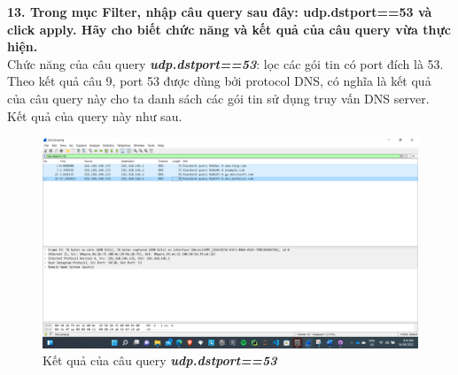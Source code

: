 \textbf{13.	 Trong mục Filter, nhập câu query sau đây: udp.dstport==53 và click apply. Hãy cho biết chức năng và kết quả của câu query vừa thực hiện.}\\
Chức năng của câu query \textbf{\textit{udp.dstport==53}}: lọc các gói tin có port đích là 53. Theo kết quả câu 9, port 53 được dùng bởi protocol DNS, có nghĩa là kết quả của câu query này cho ta danh sách các gói tin sử dụng truy vấn DNS server.\\
Kết quả của query này như sau.
\begin{figure}[H]
\begin{center}
\includegraphics[scale=.45]{../figures/p2/p2_query}
\end{center}
\caption{Kết quả của câu query \textbf{\textit{udp.dstport==53}}}
\end{figure}

